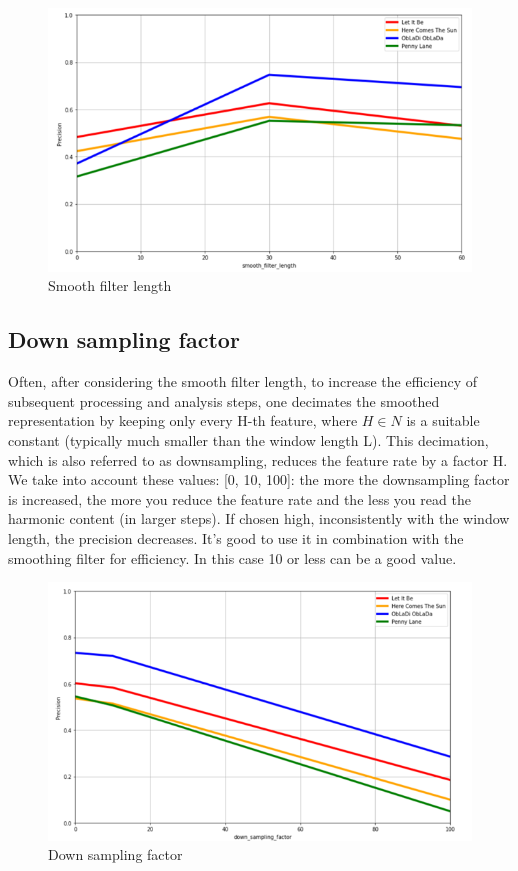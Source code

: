 \documentclass[
	12pt, %
]{fphw}
\begin{document}
\begin{figure}[H]
 \centering
 \includegraphics[scale=1]{./images/5_smooth_precision.png}
 \caption{Smooth filter length}
\end{figure}

\subsection*{Down sampling factor}

Often, after considering the smooth filter length, to increase the efficiency of subsequent processing and analysis steps, one decimates the smoothed representation by keeping only every H-th feature, where  \(H \in N\) is a suitable constant (typically much smaller than the window length L). This decimation, which is also referred to as downsampling, reduces the feature rate by a factor H.\\
We take into account these values: [0, 10, 100]: the more the downsampling factor is increased, the more you reduce the feature rate and the less you read the harmonic content (in larger steps). If chosen high, inconsistently with the window length, the precision decreases.
It's good to use it in combination with the smoothing filter for efficiency. In this case 10 or less can be a good value. 

\begin{figure}[H]
 \centering
 \includegraphics[scale=1]{./images/5_down_sampling_precision.png}
 \caption{Down sampling factor}
\end{figure}
\end{document}

